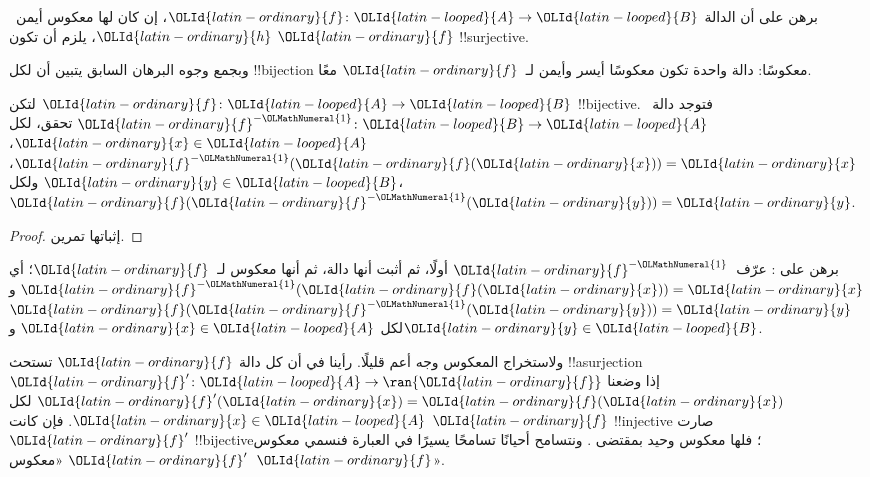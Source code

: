 \documentclass[../../../include/open-logic-section]{subfiles}
\begin{document}
\begin{prob}
برهن على أن الدالة $\OLId{latin-ordinary}{f}\colon \OLId{latin-looped}{A} \to \OLId{latin-looped}{B}$، إن كان لها معكوس أيمن~$\OLId{latin-ordinary}{h}$، يلزم
أن تكون $\OLId{latin-ordinary}{f}$ !!{surjective}.
\end{prob}

\begin{explain}
وبجمع وجوه البرهان السابق يتبين أن لكل !!{bijection} معكوسًا:
دالة واحدة تكون معكوسًا أيسر وأيمن لـ~$\OLId{latin-ordinary}{f}$ معًا.
\end{explain}

\begin{prop}
لتكن $\OLId{latin-ordinary}{f}\colon \OLId{latin-looped}{A} \to \OLId{latin-looped}{B}$ !!{bijective}. فتوجد
دالة~$\OLId{latin-ordinary}{f}^{-\OLMathNumeral{1}}\colon \OLId{latin-looped}{B} \to \OLId{latin-looped}{A}$ تحقق، لكل $\OLId{latin-ordinary}{x} \in \OLId{latin-looped}{A}$،
$\OLId{latin-ordinary}{f}^{-\OLMathNumeral{1}}(\OLId{latin-ordinary}{f}(\OLId{latin-ordinary}{x})) = \OLId{latin-ordinary}{x}$، ولكل $\OLId{latin-ordinary}{y} \in \OLId{latin-looped}{B}$، $\OLId{latin-ordinary}{f}(\OLId{latin-ordinary}{f}^{-\OLMathNumeral{1}}(\OLId{latin-ordinary}{y})) = \OLId{latin-ordinary}{y}$.
\end{prop}

\begin{proof}
إثباتها تمرين.
\end{proof}

\begin{prob}
برهن على : عرّف~$\OLId{latin-ordinary}{f}^{-\OLMathNumeral{1}}$
أولًا، ثم أثبت أنها دالة، ثم أنها معكوس لـ~$\OLId{latin-ordinary}{f}$؛ أي
$\OLId{latin-ordinary}{f}^{-\OLMathNumeral{1}}(\OLId{latin-ordinary}{f}(\OLId{latin-ordinary}{x})) = \OLId{latin-ordinary}{x}$ و$\OLId{latin-ordinary}{f}(\OLId{latin-ordinary}{f}^{-\OLMathNumeral{1}}(\OLId{latin-ordinary}{y})) = \OLId{latin-ordinary}{y}$ لكل $\OLId{latin-ordinary}{x} \in \OLId{latin-looped}{A}$ و$\OLId{latin-ordinary}{y} \in \OLId{latin-looped}{B}$.
\end{prob}

\begin{explain}
ولاستخراج المعكوس وجه أعم قليلًا. رأينا في  أن كل
دالة $\OLId{latin-ordinary}{f}$ تستحث !!a{surjection} $\OLId{latin-ordinary}{f}' \colon \OLId{latin-looped}{A} \to \ran{\OLId{latin-ordinary}{f}}$ إذا وضعنا
$\OLId{latin-ordinary}{f}'(\OLId{latin-ordinary}{x}) = \OLId{latin-ordinary}{f}(\OLId{latin-ordinary}{x})$ لكل $\OLId{latin-ordinary}{x} \in \OLId{latin-looped}{A}$. فإن كانت $\OLId{latin-ordinary}{f}$ !!{injective} صارت
$\OLId{latin-ordinary}{f}'$ !!{bijective}؛ فلها معكوس وحيد بمقتضى .
ونتسامح أحيانًا تسامحًا يسيرًا في العبارة فنسمي معكوس $\OLId{latin-ordinary}{f}'$
«معكوس~$\OLId{latin-ordinary}{f}$».
\end{explain}
\end{document}
